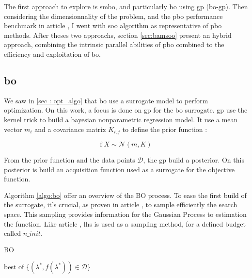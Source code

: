 The first approach to explore is \acrfull{smbo}, and particularly \acrfull{bo} using \acrfull{gp} (\acrshort{bo}-\acrshort{gp}). Then considering the dimensionnality of the problem, and the \acrshort{pbo} performance benchmark in article \cite{firmin_fractal-based_2022}, I went with \acrfull{soo} algorithm as representative of \acrshort{pbo} methods. After theses two approachs, section \ref{sec:bamsoo} present an hybrid approach, combining the intrinsic parallel abilities of \acrshort{pbo} combined to the efficiency and exploitation of \acrshort{bo}.

\subsection{\acrfull{bo}}
\label{sec:bo}

We saw in \ref{sec : opt_algo} that \acrshort{bo} use a surrogate model to perform optimization. On this work, a focus is done on \acrshort{gp} for the \acrshort{bo} surrogate. \acrshort{gp} use the kernel trick to build a bayesian nonparametric regression model. It use a mean vector $m_i$ and a covariance matrix $K_{i,j}$ to define the prior function : 

\begin{equation}
    \text{f} | X \sim  \mathcal N (m,K)
    \label{eq:prior_gp}
\end{equation}

From the prior function and the data points $\mathcal D$, the \acrshort{gp} build a posterior. On this posterior is build an acquisition function used as a surrogate for the objective function.


    

Algorithm \ref{algo:bo} offer an overview of the BO process. To ease the first build of the surrogate, it's crucial, as proven in article \cite{wilson_efficiently_2020}, to sample efficiently the search space. This sampling provides information for the Gaussian Process to estimation the function. Like article \cite{borisut_adaptive_2023}, \acrfull{lhs}\cite{mckay_comparison_1979} is used as a sampling method, for a defined budget called $n\_init$. 

\begin{algorithm}[H]
    \caption{BO}
    \label{algo:bo}
    
    
    \Return best of $\{(\lambda^*, f(\lambda^*)) \in \mathcal{D}\}$
\end{algorithm}

